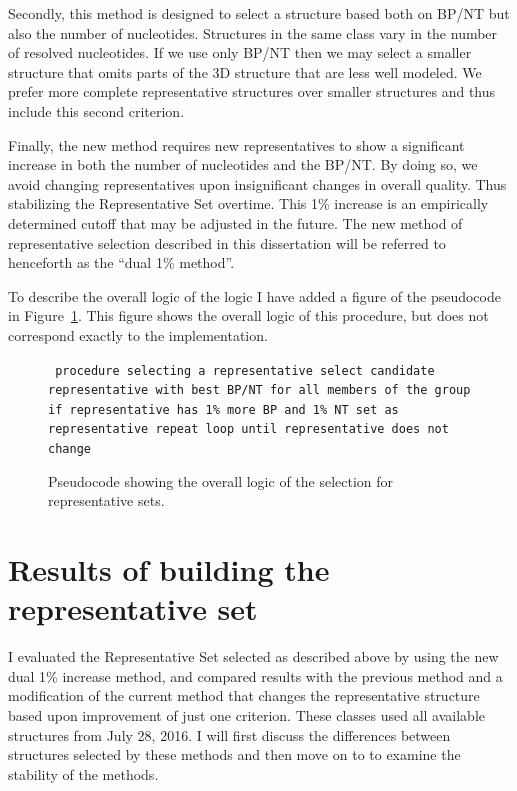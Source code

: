 Secondly, this method is designed to select a structure based both on BP/NT but
also the number of nucleotides. Structures in the same class vary in the number
of resolved nucleotides. If we use only BP/NT then we may select a  smaller
structure that omits parts of the 3D structure that are less well modeled. We
prefer more complete representative structures over smaller structures and thus
include this second criterion.

Finally, the new method requires new representatives to show a significant
increase in both the number of nucleotides and the BP/NT. By doing so, we avoid
changing representatives upon insignificant changes in overall quality. Thus
stabilizing the Representative Set overtime. This 1\% increase is an empirically
determined cutoff that may be adjusted in the future. The new method of
representative selection described in this dissertation will be referred to
henceforth as the ``dual 1\% method''.

To describe the overall logic of the logic I have added a figure of the
pseudocode in Figure~\ref{fig:pseudocode-representatives}. This figure shows the
overall logic of this procedure, but does not correspond exactly to the
implementation.

\begin{figure}
  \texttt{
    procedure selecting a representative
    select candidate representative with best BP/NT
    for all members of the group
      if representative has 1\% more BP and 1\% NT
        set as representative
    repeat loop until representative does not change
  }
  \caption{Pseudocode showing the overall logic of the selection for
  representative sets.}
  \label{fig:pseudocode-representatives}
\end{figure}

\section{Results of building the representative set}

I evaluated the Representative Set selected as described above by using the new
dual 1\% increase method, and compared results with the previous method and a
modification of the current method that changes the representative structure
based upon improvement of just one criterion. These classes used all available
structures from July 28, 2016. I will first discuss the differences between
structures selected by these methods and then move on to to examine the
stability of the methods.


